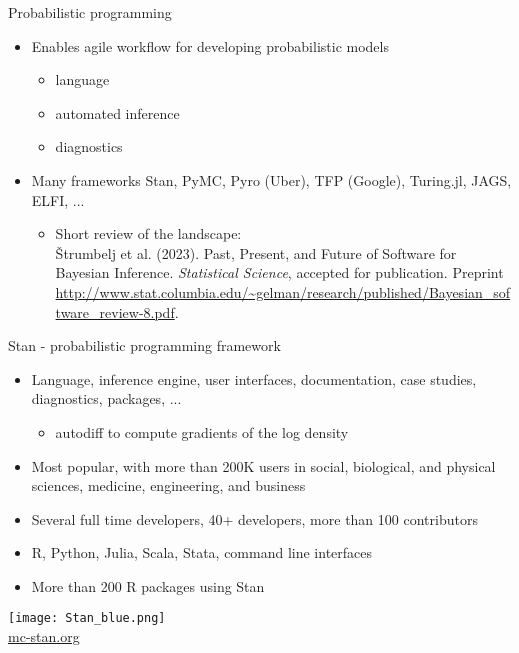 \documentclass[finnish,english,t]{beamer}
\begin{document}
\begin{frame}{Probabilistic programming}
  
  \begin{itemize}
  \item Enables agile workflow for developing probabilistic models
    \begin{itemize}
    \item language
    \item automated inference
    \item diagnostics
    \end{itemize}
  \item Many frameworks
    Stan, PyMC, Pyro (Uber), TFP (Google), Turing.jl, JAGS, ELFI, ...
    \begin{itemize}
    \item Short review of the landscape:\\
      {\small Štrumbelj et al. (2023). Past, Present, and Future of
        Software for Bayesian Inference. \textit{Statistical Science},
        accepted for publication. Preprint
        \url{http://www.stat.columbia.edu/~gelman/research/published/Bayesian_software_review-8.pdf}}.
      
    \end{itemize}
  \end{itemize}
  
\end{frame}

\begin{frame}{Stan - probabilistic programming framework}

   \begin{itemize}
   \item Language, inference engine, user interfaces, documentation,
     case studies, diagnostics, packages, ...
     \begin{itemize}
     \item autodiff to compute gradients of the log density
     \end{itemize}
   \item<2-> Most popular, with more than 200K users in social, biological, and
     physical sciences, medicine, engineering, and business
     
   \item<3-> Several full time developers, 40+ developers, more than 100 contributors
   \item<4-> R, Python, Julia, Scala, Stata, command line interfaces
    \item<4-> More than 200 R packages using Stan
   \end{itemize}
  \vfill
  \begin{center}
    \texttt{[image: Stan\_blue.png]}\\
    \url{mc-stan.org}
  \end{center}
\end{frame}
\end{document}
